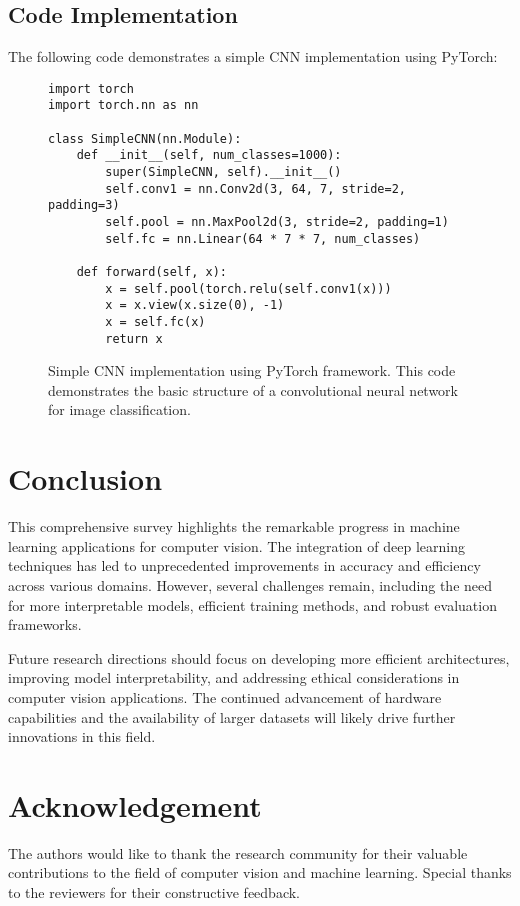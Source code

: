 \documentclass[conference, compsoc, twoside]{IEEEtran}
\begin{document}
\subsection{Code Implementation}

The following code demonstrates a simple CNN implementation using PyTorch:

\begin{figure}[h]
    \centering
\begin{lstlisting}[frame=single]
import torch
import torch.nn as nn

class SimpleCNN(nn.Module):
    def __init__(self, num_classes=1000):
        super(SimpleCNN, self).__init__()
        self.conv1 = nn.Conv2d(3, 64, 7, stride=2, padding=3)
        self.pool = nn.MaxPool2d(3, stride=2, padding=1)
        self.fc = nn.Linear(64 * 7 * 7, num_classes)
        
    def forward(self, x):
        x = self.pool(torch.relu(self.conv1(x)))
        x = x.view(x.size(0), -1)
        x = self.fc(x)
        return x
\end{lstlisting}
\caption{Simple CNN implementation using PyTorch framework. This code demonstrates the basic structure of a convolutional neural network for image classification.}
    \label{fig:code}
\end{figure}

\section{Conclusion}

This comprehensive survey highlights the remarkable progress in machine learning applications for computer vision. The integration of deep learning techniques has led to unprecedented improvements in accuracy and efficiency across various domains. However, several challenges remain, including the need for more interpretable models, efficient training methods, and robust evaluation frameworks.

Future research directions should focus on developing more efficient architectures, improving model interpretability, and addressing ethical considerations in computer vision applications. The continued advancement of hardware capabilities and the availability of larger datasets will likely drive further innovations in this field.

\section*{Acknowledgement}

The authors would like to thank the research community for their valuable contributions to the field of computer vision and machine learning. Special thanks to the reviewers for their constructive feedback.

\balance



\end{document}
